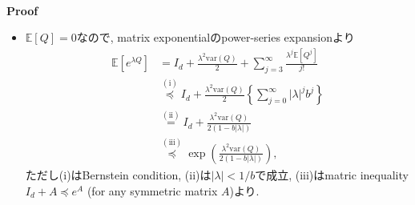 \documentclass[unicode,aspectratio=169,11pt]{beamer}
\newcommand{\ex}{\mathbb{E}}
\newcommand{\var}{\mathrm{var}}
\begin{document}
\begin{frame}{}{}
  　\\
  {\bf Proof}
  \begin{itemize}
    \item $\ex[Q] = 0$なので, matrix exponentialのpower-series expansionより
          \begin{align*}
            \ex[e^{\lambda Q}] 
            &= I_d + \frac{\lambda^2 \var(Q)}{2} + \sum_{j=3}^\infty \frac{\lambda^j \ex[Q^j]}{j!}\\
            &\stackrel{(\mathrm{i})}{\preceq} I_d + \frac{\lambda^2 \var(Q)}{2}\left\{\sum_{j=0}^\infty |\lambda|^jb^j\right\}\\
            &\stackrel{(\mathrm{ii})}{=} I_d + \frac{\lambda^2 \var(Q)}{2(1 - b|\lambda|)} \\
            &\stackrel{(\mathrm{iii})}{\preceq} \exp\left( \frac{\lambda^2 \var(Q)}{2(1 - b|\lambda|)} \right),
          \end{align*}
          ただし(i)はBernstein condition, (ii)は$|\lambda| < 1/b$で成立, (iii)はmatric inequality $I_d + A \preceq e^A$ (for any symmetric matrix $A$)より.
  \end{itemize} 
\end{frame}
\end{document}
